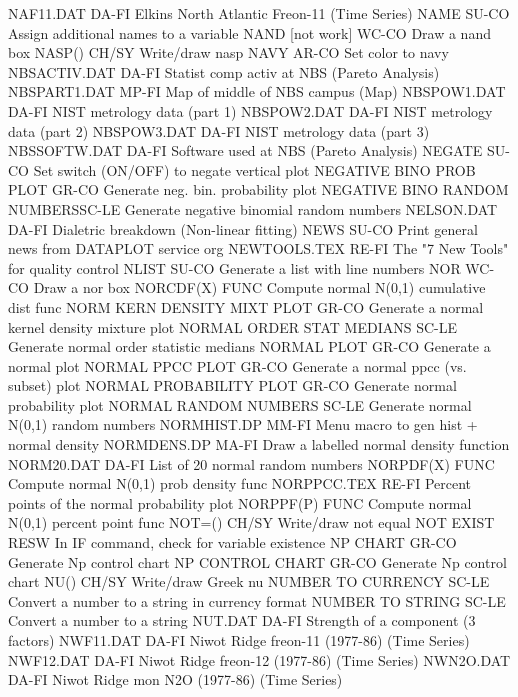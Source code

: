 NAF11.DAT                   DA-FI Elkins North Atlantic Freon-11 (Time Series)
NAME                        SU-CO Assign additional names to a variable
NAND       [not work]       WC-CO Draw a nand box
NASP()                      CH/SY Write/draw nasp
NAVY                        AR-CO Set color to navy
NBSACTIV.DAT                DA-FI Statist comp activ at NBS (Pareto Analysis)
NBSPART1.DAT                MP-FI Map of middle of NBS campus (Map)
NBSPOW1.DAT                 DA-FI NIST metrology data (part 1)
NBSPOW2.DAT                 DA-FI NIST metrology data (part 2)
NBSPOW3.DAT                 DA-FI NIST metrology data (part 3)
NBSSOFTW.DAT                DA-FI Software used at NBS (Pareto Analysis)
NEGATE                      SU-CO Set switch (ON/OFF) to negate vertical plot
NEGATIVE BINO PROB PLOT     GR-CO Generate neg. bin. probability plot
NEGATIVE BINO RANDOM NUMBERSSC-LE Generate negative binomial random numbers
NELSON.DAT                  DA-FI Dialetric breakdown (Non-linear fitting)
NEWS                        SU-CO Print general news from DATAPLOT service org
NEWTOOLS.TEX                RE-FI The "7 New Tools" for quality control
NLIST                       SU-CO Generate a list with line numbers
NOR                         WC-CO Draw a nor box
NORCDF(X)                   FUNC  Compute normal N(0,1) cumulative dist func
NORM KERN DENSITY MIXT PLOT GR-CO Generate a normal kernel density mixture plot
NORMAL ORDER STAT MEDIANS   SC-LE Generate normal order statistic medians
NORMAL PLOT                 GR-CO Generate a normal plot
NORMAL PPCC PLOT            GR-CO Generate a normal ppcc (vs. subset) plot
NORMAL PROBABILITY PLOT     GR-CO Generate normal probability plot
NORMAL RANDOM NUMBERS       SC-LE Generate normal N(0,1) random numbers
NORMHIST.DP                 MM-FI Menu macro to gen hist + normal density
NORMDENS.DP                 MA-FI Draw a labelled normal density function
NORM20.DAT                  DA-FI List of 20 normal random numbers
NORPDF(X)                   FUNC  Compute normal N(0,1) prob density func
NORPPCC.TEX                 RE-FI Percent points of the normal probability plot
NORPPF(P)                   FUNC  Compute normal N(0,1) percent point func
NOT=()                      CH/SY Write/draw not equal
NOT EXIST                   RESW  In IF command, check for variable existence
NP CHART                    GR-CO Generate Np control chart
NP CONTROL CHART            GR-CO Generate Np control chart
NU()                        CH/SY Write/draw Greek nu
NUMBER TO CURRENCY          SC-LE Convert a number to a string in currency format
NUMBER TO STRING            SC-LE Convert a number to a string
NUT.DAT                     DA-FI Strength of a component (3 factors)
NWF11.DAT                   DA-FI Niwot Ridge freon-11 (1977-86) (Time Series)
NWF12.DAT                   DA-FI Niwot Ridge freon-12 (1977-86) (Time Series)
NWN2O.DAT                   DA-FI Niwot Ridge mon N2O (1977-86) (Time Series)

